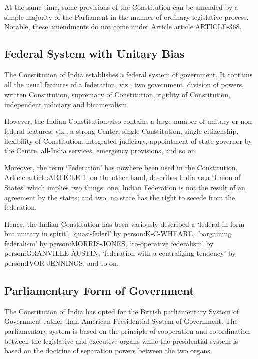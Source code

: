 \begin{multicol}{2}
At the same time, some provisions of the Constitution can be amended by a simple majority of the Parliament in the manner of ordinary legislative process. Notable, these amendments do not come under Article \gls{article:ARTICLE-368}.

\subsection{Federal System with Unitary Bias}

The Constitution of India establishes a federal system of government. It contains all the usual features of a federation, viz., two government, division of powers, written Constitution, supremacy of Constitution, rigidity of Constitution, independent judiciary and bicameralism.

However, the Indian Constitution also contains a large number of unitary or non-federal features, viz., a strong Center, single Constitution, single citizenship, flexibility of Constitution, integrated judiciary, appointment of state governor by the Centre, all-India services, emergency provisions, and so on.

Moreover, the term `Federation' has nowhere been used in the Constitution. Article \gls{article:ARTICLE-1}, on the other hand, describes India as a `Union of States' which implies two things: one, Indian Federation is not the result of an agreement by the states; and two, no state has the right to secede from the federation.

Hence, the Indian Constitution has been variously described a `federal in form but unitary in spirit', `quasi-federl' by \gls{person:K-C-WHEARE}, `bargaining federalism' by \gls{person:MORRIS-JONES}, `co-operative federalism' by \gls{person:GRANVILLE-AUSTIN}, `federation with a centralizing tendency' by \gls{person:IVOR-JENNINGS}, and so on.

\subsection{Parliamentary Form of Government}

The Constitution of India has opted for the British parliamentary System of Government rather than American Presidential System of Government. The parliamentary system is based on the principle of cooperation and co-ordination between the legislative and executive organs while the presidential system is based on the doctrine of separation powers between the two organs.


\end{multicol}
